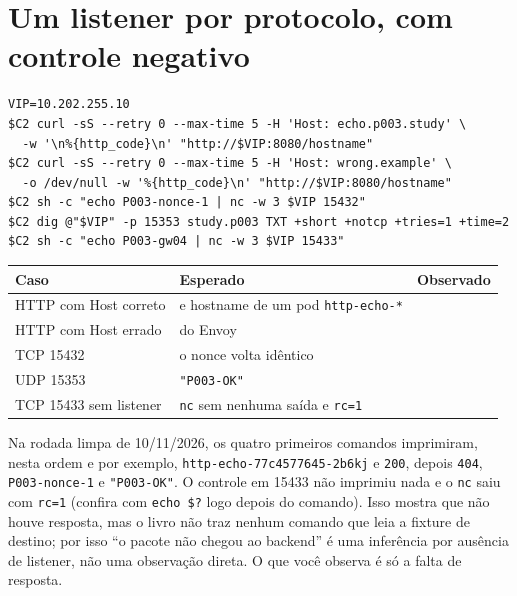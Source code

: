 \documentclass[12pt,openany,oneside,a4paper,chapter=TITLE,english,brazil]{abntex2}
\begin{document}
\section{Um listener por protocolo, com controle negativo}\label{um-listener-por-protocolo-com-controle-negativo}

\begin{verbatim}
VIP=10.202.255.10
$C2 curl -sS --retry 0 --max-time 5 -H 'Host: echo.p003.study' \
  -w '\n%{http_code}\n' "http://$VIP:8080/hostname"
$C2 curl -sS --retry 0 --max-time 5 -H 'Host: wrong.example' \
  -o /dev/null -w '%{http_code}\n' "http://$VIP:8080/hostname"
$C2 sh -c "echo P003-nonce-1 | nc -w 3 $VIP 15432"
$C2 dig @"$VIP" -p 15353 study.p003 TXT +short +notcp +tries=1 +time=2
$C2 sh -c "echo P003-gw04 | nc -w 3 $VIP 15433"
\end{verbatim}

\begin{quadro}[!htbp]
\caption{Registro do Módulo 6: listeners e controle negativo}
\footnotesize
\begin{tabularx}{\textwidth}{|>{\raggedright\arraybackslash\hsize=1.109\hsize}X|>{\raggedright\arraybackslash\hsize=1.182\hsize}X|>{\raggedright\arraybackslash\hsize=0.709\hsize}X|}
\hline
\textbf{Caso} & \textbf{Esperado} & \textbf{Observado} \\
\hline
HTTP com Host correto & 200 e hostname de um pod
\texttt{http-{}\allowbreak{}echo-{}\allowbreak{}*} &  \\
\hline
HTTP com Host errado & 404 do Envoy &  \\
\hline
TCP 15432 & o nonce volta idêntico &  \\
\hline
UDP 15353 & \texttt{"P003-{}\allowbreak{}OK"} &  \\
\hline
TCP 15433 sem listener & \texttt{nc} sem nenhuma saída e \texttt{rc=\allowbreak{}1} &  \\
\hline
\end{tabularx}
\end{quadro}

Na rodada limpa de 10/11/2026, os quatro primeiros comandos imprimiram, nesta
ordem e por exemplo, \texttt{http-{}\allowbreak{}echo-{}\allowbreak{}77c4577645-{}\allowbreak{}2b6kj} e \texttt{200}, depois \texttt{404}, \texttt{P003-{}\allowbreak{}nonce-{}\allowbreak{}1} e
\texttt{"P003-{}\allowbreak{}OK"}. O controle em 15433 não imprimiu nada e o \texttt{nc} saiu com \texttt{rc=\allowbreak{}1}
(confira com \texttt{echo \$?} logo depois do comando). Isso mostra que não houve
resposta, mas o livro não traz nenhum comando que leia a fixture de destino;
por isso ``o pacote não chegou ao backend'' é uma inferência por ausência de
listener, não uma observação direta. O que você observa é só a falta de resposta.
\end{document}
